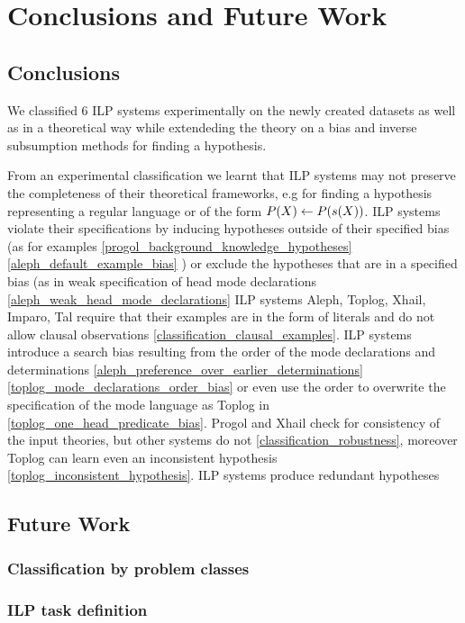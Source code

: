 \chapter{Conclusions and Future Work}\label{ch:conclusions}

\section{Conclusions}
We classified 6 ILP systems experimentally on the newly created datasets as well as in a theoretical way while extendeding the theory on a bias and inverse subsumption methods for finding a hypothesis.

From an experimental classification we learnt that ILP systems may not preserve the completeness of their theoretical frameworks, e.g for finding a hypothesis representing a regular language or of the form $P(X) \leftarrow P(s(X))$.
ILP systems violate their specifications by inducing hypotheses outside of their specified bias (as for examples
\ref{progol_background_knowledge_hypotheses}
\ref{aleph_default_example_bias}
) or exclude the hypotheses that are in a specified bias (as in weak specification of head mode declarations \ref{aleph_weak_head_mode_declarations}
ILP systems Aleph, Toplog, Xhail, Imparo, Tal require that their examples are in the form of literals and do not allow clausal observations \ref{classification_clausal_examples}.
ILP systems introduce a search bias resulting from the order of the mode declarations and determinations 
\ref{aleph_preference_over_earlier_determinations}
\ref{toplog_mode_declarations_order_bias} or
even use the order to overwrite the specification of the mode language as Toplog in \ref{toplog_one_head_predicate_bias}.
Progol and Xhail check for consistency of the input theories, but other systems do not \ref{classification_robustness}, moreover Toplog can learn even an inconsistent hypothesis \ref{toplog_inconsistent_hypothesis}.
ILP systems produce redundant hypotheses 
\section{Future Work}

\subsection{Classification by problem classes}

\subsection{ILP task definition}

